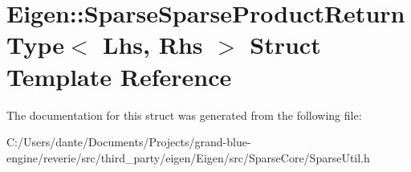 \hypertarget{struct_eigen_1_1_sparse_sparse_product_return_type}{}\section{Eigen\+::Sparse\+Sparse\+Product\+Return\+Type$<$ Lhs, Rhs $>$ Struct Template Reference}
\label{struct_eigen_1_1_sparse_sparse_product_return_type}


The documentation for this struct was generated from the following file\+:\begin{DoxyCompactItemize}
\item 
C\+:/\+Users/dante/\+Documents/\+Projects/grand-\/blue-\/engine/reverie/src/third\+\_\+party/eigen/\+Eigen/src/\+Sparse\+Core/Sparse\+Util.\+h\end{DoxyCompactItemize}
